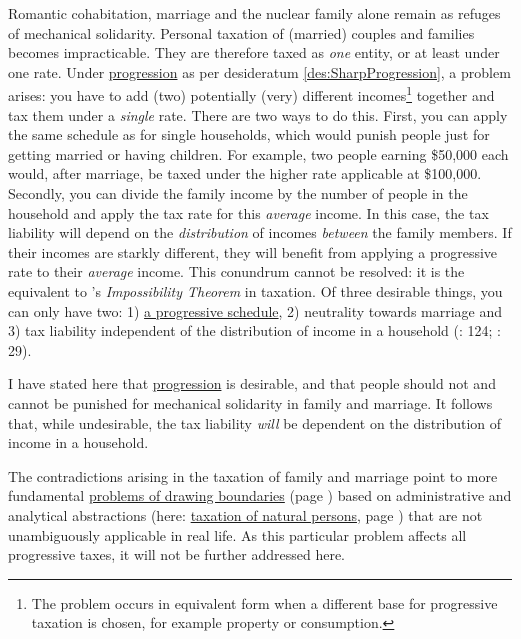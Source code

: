 
Romantic cohabitation, marriage and the nuclear family alone remain as refuges of mechanical solidarity. Personal taxation of (married) couples and families becomes impracticable. They are therefore taxed as \emph{one} entity, or at least under one rate. Under \href{des:SharpProgression}{progression} as per desideratum \ref{des:SharpProgression}, a problem arises: you have to add (two) potentially (very) different incomes\footnote{The problem occurs in equivalent form when a different base for progressive taxation is chosen, for example property or consumption.} together and tax them under a \emph{single} rate. There are two ways to do this. First, you can apply the same schedule as for single households, which would punish people just for getting married or having children. For example, two people earning \$50,000 each would, after marriage, be taxed under the higher rate applicable at \$100,000. Secondly, you can divide the family income by the number of people in the household and apply the tax rate for this \emph{average} income. In this case, the tax liability will depend on the \emph{distribution} of incomes \emph{between} the family members. If their incomes are starkly different, they will benefit from applying a progressive rate to their \emph{average} income. This conundrum cannot be resolved: it is the equivalent to \citeauthor{Arrow1950}'s \emph{Impossibility Theorem} in taxation. Of three desirable things, you can only have two: 1) \href{des:SharpProgression}{a progressive schedule}, 2) neutrality towards marriage and 3) tax liability independent of the distribution of income in a household (\citealt{Moffitt2003}: 124; \citealt{Dalsgaard2005}: 29).

I have stated here that \href{des:SharpProgression}{progression} is desirable, and that people should not and cannot be punished for mechanical solidarity in family and marriage. It follows that, while undesirable, the tax liability \emph{will} be dependent on the distribution of income in a household.

The contradictions arising in the taxation of family and marriage point to more fundamental \href{sec:WorkPlay}{problems of drawing boundaries} (page \pageref{sec:WorkPlay}) based on administrative and analytical abstractions (here: \hyperref[des:PersonalTaxation]{taxation of natural persons}, page \pageref{des:PersonalTaxation}) that are not unambiguously applicable in real life. As this particular problem affects all progressive taxes, it will not be further addressed here.


